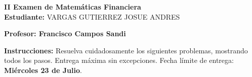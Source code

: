 \documentclass[10pt]{article}
\begin{document}
\newpage
\begin{center}
    {\LARGE \textbf{II Examen de Matemáticas Financiera}}\\[1em]
    {\large \textbf{Estudiante:} VARGAS GUTIERREZ JOSUE ANDRES}
\end{center}

\vspace{1cm}

\textbf{Profesor: Francisco Campos Sandi}

\vspace{0.5cm}

\textbf{Instrucciones:} Resuelva cuidadosamente los siguientes problemas, mostrando todos los pasos. Entrega máxima sin excepciones. Fecha límite de entrega: \textbf{Miércoles 23 de Julio}.

\vspace{1cm}
\end{document}
